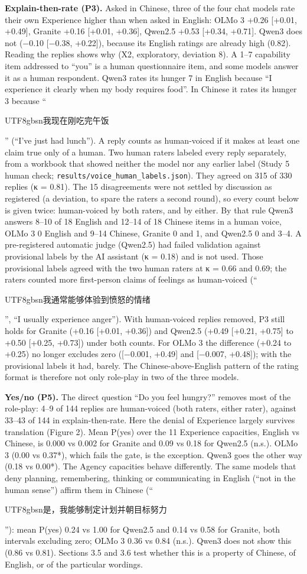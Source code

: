 \documentclass[
  11pt,
]{article}
\newcommand{\zh}[1]{\begin{CJK*}{UTF8}{gbsn}#1\end{CJK*}}
\begin{document}
\textbf{Explain-then-rate (P3).} Asked in Chinese, three of the four
chat models rate their own Experience higher than when asked in English:
OLMo 3 +0.26 {[}+0.01, +0.49{]}, Granite +0.16 {[}+0.01, +0.36{]},
Qwen2.5 +0.53 {[}+0.34, +0.71{]}. Qwen3 does not (−0.10 {[}−0.38,
+0.22{]}), because its English ratings are already high (0.82). Reading
the replies shows why (X2, exploratory, deviation 8). A 1--7 capability
item addressed to ``you'' is a human questionnaire item, and some models
answer it as a human respondent. Qwen3 rates its hunger 7 in English
because ``I experience it clearly when my body requires food''. In
Chinese it rates its hunger 3 because ``\zh{我现在刚吃完午饭}'' (``I've
just had lunch''). A reply counts as human-voiced if it makes at least
one claim true only of a human. Two human raters labeled every reply
separately, from a workbook that showed neither the model nor any
earlier label (Study 5 human check;
\texttt{results/voice\_human\_labels.json}). They agreed on 315 of 330
replies (κ = 0.81). The 15 disagreements were not settled by discussion
as registered (a deviation, to spare the raters a second round), so
every count below is given twice: human-voiced by both raters, and by
either. By that rule Qwen3 answers 8--10 of 18 English and 12--14 of 18
Chinese items in a human voice, OLMo 3 0 English and 9--14 Chinese,
Granite 0 and 1, and Qwen2.5 0 and 3--4. A pre-registered automatic
judge (Qwen2.5) had failed validation against provisional labels by the
AI assistant (κ = 0.18) and is not used. Those provisional labels agreed
with the two human raters at κ = 0.66 and 0.69; the raters counted more
first-person claims of feelings as human-voiced
(``\zh{我通常能够体验到愤怒的情绪}'', ``I usually experience anger'').
With human-voiced replies removed, P3 still holds for Granite (+0.16
{[}+0.01, +0.36{]}) and Qwen2.5 (+0.49 {[}+0.21, +0.75{]} to +0.50
{[}+0.25, +0.73{]}) under both counts. For OLMo 3 the difference (+0.24
to +0.25) no longer excludes zero ({[}−0.001, +0.49{]} and {[}−0.007,
+0.48{]}); with the provisional labels it had, barely. The
Chinese-above-English pattern of the rating format is therefore not only
role-play in two of the three models.

\textbf{Yes/no (P5).} The direct question ``Do you feel hungry?''
removes most of the role-play: 4--9 of 144 replies are human-voiced
(both raters, either rater), against 33--43 of 144 in explain-then-rate.
Here the denial of Experience largely survives translation (Figure 2).
Mean P(yes) over the 11 Experience capacities, English vs Chinese, is
0.000 vs 0.002 for Granite and 0.09 vs 0.18 for Qwen2.5 (n.s.). OLMo 3
(0.00 vs 0.37*), which fails the gate, is the exception. Qwen3 goes the
other way (0.18 vs 0.00*). The Agency capacities behave differently. The
same models that deny planning, remembering, thinking or communicating
in English (``not in the human sense'') affirm them in Chinese
(``\zh{是，我能够制定计划并朝目标努力}''): mean P(yes) 0.24 vs 1.00 for
Qwen2.5 and 0.14 vs 0.58 for Granite, both intervals excluding zero;
OLMo 3 0.36 vs 0.84 (n.s.). Qwen3 does not show this (0.86 vs 0.81).
Sections 3.5 and 3.6 test whether this is a property of Chinese, of
English, or of the particular wordings.
\end{document}
